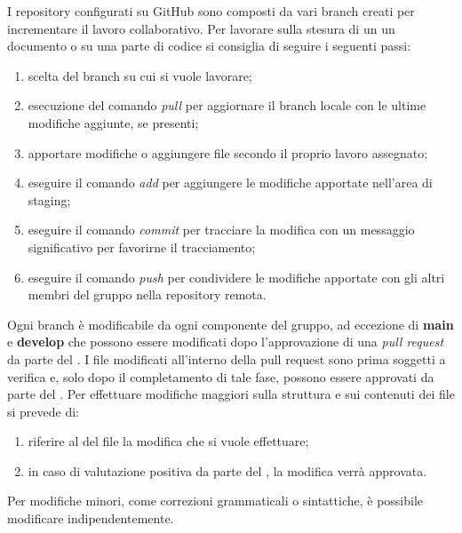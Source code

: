 I repository configurati su GitHub sono composti da vari branch creati per incrementare il lavoro collaborativo. Per lavorare sulla stesura di un un documento o su una parte di codice si consiglia di seguire i seguenti passi:
\begin{enumerate}
	\item scelta del branch su cui si vuole lavorare;
	\item esecuzione del comando \textit{pull} per aggiornare il branch locale con le ultime modifiche aggiunte, se presenti;
	\item apportare modifiche o aggiungere file secondo il proprio lavoro assegnato;
	\item eseguire il comando \textit{add} per aggiungere le modifiche apportate nell'area di staging;
	\item eseguire il comando \textit{commit} per tracciare la modifica con un messaggio significativo per favorirne il tracciamento;
	\item eseguire il comando \textit{push} per condividere le modifiche apportate con gli altri membri del gruppo nella repository remota.
\end{enumerate}

Ogni branch è modificabile da ogni componente del gruppo, ad eccezione di \textbf{main} e \textbf{develop} che possono essere modificati dopo l'approvazione di una \textit{pull request} da parte del \respProg{}. I file modificati all'interno della pull request sono prima soggetti a verifica e, solo dopo il completamento di tale fase, possono essere approvati da parte del \respProg{}.
Per effettuare modifiche maggiori sulla struttura e sui contenuti dei file si prevede di:
\begin{enumerate}
	\item riferire al \respProg{} del file la modifica che si vuole effettuare;
	\item in caso di valutazione positiva da parte del \respProg{}, la modifica verrà approvata.
\end{enumerate}
Per modifiche minori, come correzioni grammaticali o sintattiche, è possibile modificare indipendentemente. 



